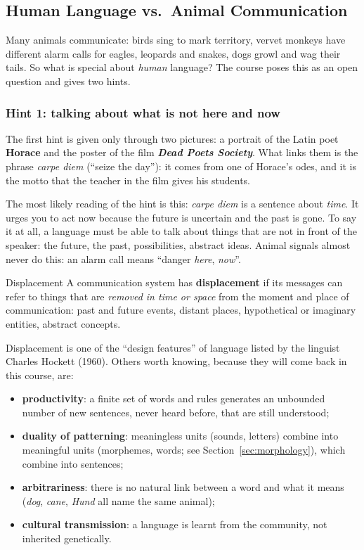 \subsection{Human Language vs.\ Animal Communication}
\label{sec:human-vs-animal}

Many animals communicate: birds sing to mark territory, vervet monkeys have different
alarm calls for eagles, leopards and snakes, dogs growl and wag their tails. So what is
special about \emph{human} language? The course poses this as an open question and
gives two hints.

\subsubsection{Hint 1: talking about what is not here and now}

The first hint is given only through two pictures: a portrait of the Latin poet
\textbf{Horace} and the poster of the film \textbf{\emph{Dead Poets Society}}. What links
them is the phrase \emph{carpe diem} (``seize the day''): it comes from one of Horace's
odes, and it is the motto that the teacher in the film gives his students.

The most likely reading of the hint is this: \emph{carpe diem} is a sentence about
\emph{time}. It urges you to act now because the future is uncertain and the past is
gone. To say it at all, a language must be able to talk about things that are not in front
of the speaker: the future, the past, possibilities, abstract ideas. Animal signals almost
never do this: an alarm call means ``danger \emph{here}, \emph{now}''.

\begin{nbdef}{Displacement}
A communication system has \textbf{displacement} if its messages can refer to things
that are \emph{removed in time or space} from the moment and place of communication:
past and future events, distant places, hypothetical or imaginary entities, abstract
concepts.
\end{nbdef}

Displacement is one of the ``design features'' of language listed by the linguist
Charles Hockett (1960). Others worth knowing, because they will come back in this course,
are:
\begin{itemize}[nosep]
  \item \textbf{productivity}: a finite set of words and rules generates an unbounded
        number of new sentences, never heard before, that are still understood;
  \item \textbf{duality of patterning}: meaningless units (sounds, letters) combine into
        meaningful units (morphemes, words; see Section~\ref{sec:morphology}), which
        combine into sentences;
  \item \textbf{arbitrariness}: there is no natural link between a word and what it
        means (\emph{dog}, \emph{cane}, \emph{Hund} all name the same animal);
  \item \textbf{cultural transmission}: a language is learnt from the community, not
        inherited genetically.
\end{itemize}

